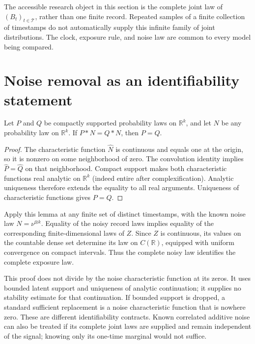The accessible research object in this section is the complete joint law of
$(B_t)_{t\in\mathcal T}$, rather than one finite record. Repeated samples
of a finite collection of timestamps do not automatically supply this
infinite family of joint distributions. The clock, exposure rule, and noise
law are common to every model being compared.

\section{Noise removal as an identifiability statement}

\begin{lemma}
\label{lem:dg-bounded-convolution}
Let $P$ and $Q$ be compactly supported probability laws on $\mathbb R^k$,
and let $N$ be any probability law on $\mathbb R^k$. If
$P*N=Q*N$, then $P=Q$.
\end{lemma}

\begin{proof}
The characteristic function $\widehat N$ is continuous and equals one at
the origin, so it is nonzero on some neighborhood of zero. The convolution
identity implies $\widehat P=\widehat Q$ on that neighborhood. Compact
support makes both characteristic functions real analytic on
$\mathbb R^k$ (indeed entire after complexification). Analytic uniqueness
therefore extends the equality to all real arguments. Uniqueness of
characteristic functions gives $P=Q$.
\end{proof}

Apply this lemma at any finite set of distinct timestamps, with the known
noise law $N=\nu^{\otimes k}$. Equality of the noisy record laws implies
equality of the corresponding finite-dimensional laws of $Z$. Since $Z$ is
continuous, its values on the countable dense set determine its law on
$C(\mathbb R)$, equipped with uniform convergence on compact intervals.
Thus the complete noisy law identifies the complete exposure law.

This proof does not divide by the noise characteristic function at its
zeros. It uses bounded latent support and uniqueness of analytic
continuation; it supplies no stability estimate for that continuation. If
bounded support is dropped, a standard sufficient replacement is a noise
characteristic function that is nowhere zero. These are different
identifiability contracts. Known correlated additive noise can also be
treated if its complete joint laws are supplied and remain independent of
the signal; knowing only its one-time marginal would not suffice.

